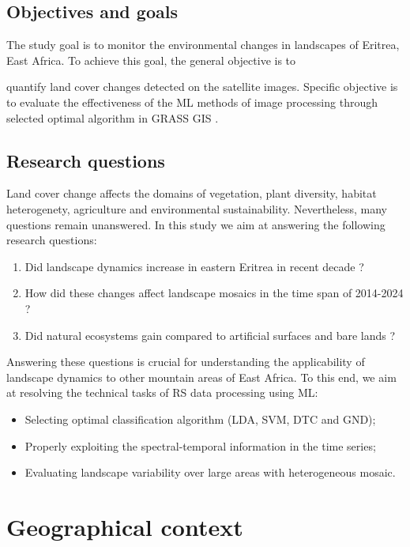 \documentclass[sn-mathphys-num]{sn-jnl}%
\theoremstyle{thmstyleone}%
\theoremstyle{thmstyletwo}%
\theoremstyle{thmstylethree}%
\begin{document}
\subsection{Objectives and goals}

The study goal is to monitor the environmental changes in landscapes of Eritrea, East Africa. To achieve this goal, the general objective is to {quantify land cover changes detected on the satellite images. Specific objective is to evaluate the effectiveness of the ML methods of image processing through selected optimal algorithm in GRASS GIS \cite{grass_development_team_2025_14918754}. 
 
 \subsection{Research questions}
 
{Land cover change affects the domains of vegetation, plant diversity, habitat heterogenety, agriculture and environmental sustainability. Nevertheless, many questions remain unanswered. In this study we aim at answering the following research questions:}  
\begin{enumerate}
	\item Did landscape dynamics increase in eastern Eritrea in recent decade ?
	\item How did these changes affect landscape mosaics in the time span of 2014-2024 ?
	\item Did natural ecosystems gain compared to artificial surfaces and bare lands ?
\end{enumerate}
Answering these questions is crucial for understanding the applicability of landscape dynamics to other mountain areas of East Africa. To this end, we aim at resolving the technical tasks of RS data processing using ML:
\begin{itemize}
	\item Selecting optimal classification algorithm (LDA, SVM, DTC and GND);
	\item Properly exploiting the spectral-temporal information in the time series;
	\item Evaluating landscape variability over large areas with heterogeneous mosaic.
\end{itemize}

\section{Geographical context}

}
\end{document}
